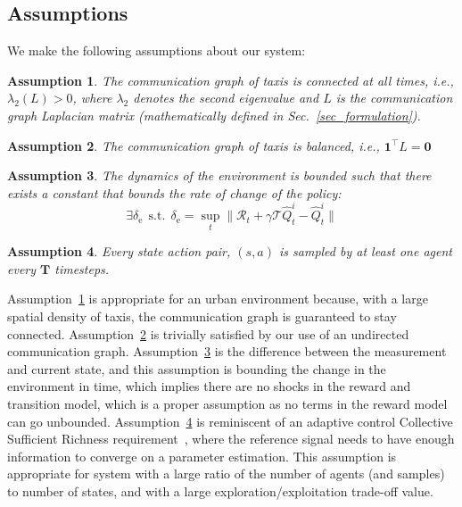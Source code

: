 \documentclass[journal]{IEEEtran}
\newtheorem{assumption}{Assumption}
\begin{document}
\subsection{Assumptions}
We make the following assumptions about our system: 
\begin{assumption}
    \label{assumption: connected}
    The communication graph of taxis is connected at all times, i.e., $\lambda_2(L) > 0$, where $\lambda_2$ denotes the second eigenvalue and $L$ is the communication graph Laplacian matrix (mathematically defined in Sec.~\ref{sec_formulation}). 
\end{assumption}
\begin{assumption}
    \label{assumption: balanced}
    The communication graph of taxis is balanced, i.e., $\boldsymbol{1}^\intercal L = \boldsymbol{0}$
\end{assumption}
\begin{assumption}
    \label{assumption: bounded_changing_environment}
    The dynamics of the environment is bounded such that there exists a constant that bounds the rate of change of the policy: $$\exists \delta_\mathrm{e} \ \ \mathrm{s.t.} \ \ \delta_\mathrm{e} = \sup_{t} \| \mathcal{R}_t + \gamma \mathcal{T} \hat{Q}^i_t - \hat{Q}^i_{t} \|$$ 
\end{assumption}
\begin{assumption}
    \label{assumption: periodic_full_measurement}
    Every state action pair, $(s,a)$ is sampled by at least one agent every $\boldsymbol{T}$ timesteps. 
\end{assumption}
Assumption~\ref{assumption: connected} is appropriate for an urban environment because, with a large spatial density of taxis, the communication graph is guaranteed to stay connected. Assumption~\ref{assumption: balanced} is trivially satisfied by our use of an undirected communication graph. Assumption~\ref{assumption: bounded_changing_environment} is the difference between the measurement and current state, and this assumption is bounding the change in the environment in time, which implies there are no shocks in the reward and transition model, which is a proper assumption as no terms in the reward model can go unbounded. Assumption~\ref{assumption: periodic_full_measurement} is reminiscent of an adaptive control Collective Sufficient Richness requirement~\cite{slotine_cloud}, where the reference signal needs to have enough information to converge on a parameter estimation. This assumption is appropriate for system with a large ratio of the number of agents (and samples) to number of states, and with a large exploration/exploitation trade-off value.
\end{document}
